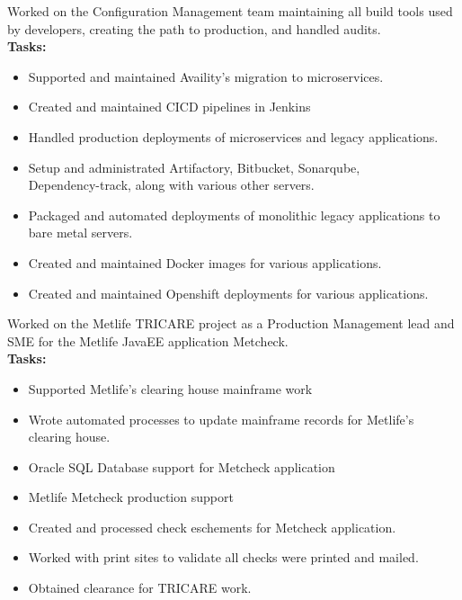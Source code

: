 \documentclass[10pt,a4paper,ragged2e,withhyper]{altacv}
\begin{document}
\begin{paracol}{2}

Worked on the Configuration Management team maintaining all build tools used by developers, creating the path to production, and handled audits.  \\

\smallskip
\textbf{Tasks:}
\begin{itemize}
\item Supported and maintained Availity's migration to microservices.
\item Created and maintained CICD pipelines in Jenkins
\item Handled production deployments of microservices and legacy applications.
\item Setup and administrated Artifactory, Bitbucket, Sonarqube, \\Dependency-track, along with various other servers. 
\item Packaged and automated deployments of monolithic legacy applications to bare metal servers.
\item Created and maintained Docker images for various applications.
\item Created and maintained Openshift deployments for various applications.
\end{itemize}

\divider

  Worked on the Metlife TRICARE project as a Production Management lead and SME for the Metlife JavaEE application Metcheck. \\
\smallskip
\textbf{Tasks:}
\begin{itemize}
\item Supported Metlife's clearing house mainframe work
\item Wrote automated processes to update mainframe records for Metlife's clearing house. 
\item Oracle SQL Database support for Metcheck application
\item Metlife Metcheck production support
\item Created and processed check eschements for Metcheck application.
\item Worked with print sites to validate all checks were printed and mailed. 
\item Obtained clearance for TRICARE work.
\end{itemize}


\end{paracol}
\end{document}
